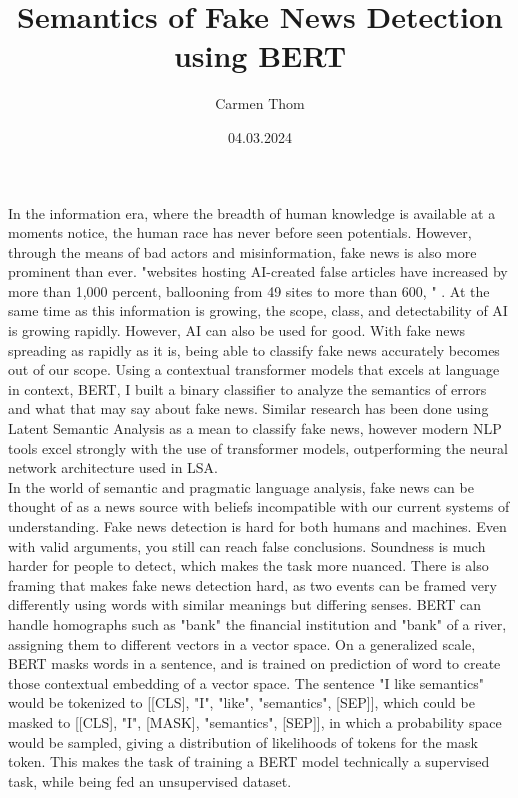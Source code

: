 \documentclass[12pt]{article}
\title{Semantics of Fake News Detection using BERT}
\author{Carmen Thom}
\date{04.03.2024}
\begin{document}
\maketitle
\onehalfspace


In the information era, where the breadth of human knowledge is available at a moments notice, the human race has never before seen potentials. However, through the means of bad actors and misinformation, fake news is also more prominent than ever. "websites hosting AI-created false articles have increased by more than 1,000 percent, ballooning from 49 sites to more than 600, " \cite{Verma_2023}. At the same time as this information is growing, the scope, class, and detectability of AI is growing rapidly. However, AI can also be used for good. With fake news spreading as rapidly as it is, being able to classify fake news accurately becomes out of our scope. Using a contextual transformer models that excels at language in context, BERT, I built a binary classifier to analyze the semantics of errors and what that may say about fake news. Similar research has been done using Latent Semantic Analysis as a mean to classify fake news, however modern NLP tools excel strongly with the use of transformer models, outperforming the neural network architecture used in LSA. \\

In the world of semantic and pragmatic language analysis, fake news can be thought of as a news source with beliefs incompatible with our current systems of understanding. Fake news detection is hard for both humans and machines. Even with valid arguments, you still can reach false conclusions. Soundness is much harder for people to detect, which makes the task more nuanced. There is also framing that makes fake news detection hard, as two events can be framed very differently using words with similar meanings but differing senses. BERT can handle homographs such as "bank" the financial institution and "bank" of a river, assigning them to different vectors in a vector space. On a generalized scale, BERT masks words in a sentence, and is trained on prediction of word to create those contextual embedding of a vector space. The sentence "I like semantics" would be tokenized to [[CLS], "I", "like", "semantics", [SEP]], which could be masked to [[CLS], "I", [MASK], "semantics", [SEP]], in which a probability space would be sampled, giving a distribution of likelihoods of tokens for the mask token. This makes the task of training a BERT model technically a supervised task, while being fed an unsupervised dataset. \\
\end{document}

